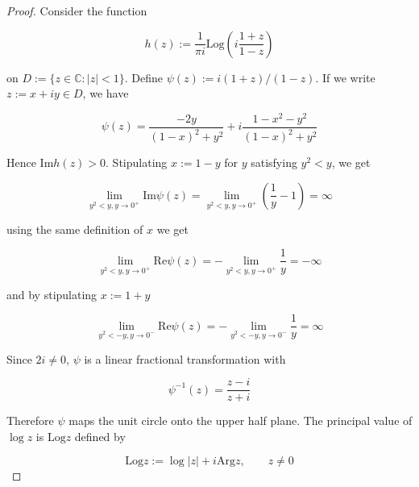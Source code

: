 \begin{proof}
	Consider the function 

	\begin{equation}
		h(z) := \frac{1}{\pi i}\mathrm{Log}\left( i\frac{1 + z}{1 - z} \right)
	\end{equation}

	on $D := \{z \in \mathbb{C} : \vert z \vert < 1\}$. Define $\psi(z) := i(1 + z)/(1 - z)$. If we write $z := x + iy \in D$, we have 

	\begin{equation}
		\psi(z) = \frac{-2y}{(1 - x)^2 + y^2} + i \frac{1 - x^2 - y^2}{(1 - x)^2 + y^2}
	\end{equation}

	Hence $\mathrm{Im} h(z) > 0$. Stipulating $x := 1 - y$ for $y$ satisfying $y^2 < y$, we get

	\begin{equation}
		\lim\limits_{y^2 < y, y \rightarrow 0^+} \mathrm{Im} \psi(z) = \lim\limits_{y^2 < y, y \rightarrow 0^+} \left( \frac{1}{y} - 1 \right) = \infty
	\end{equation}

	using the same definition of $x$ we get

	\begin{equation}
		\lim\limits_{y^2 < y, y \rightarrow 0^+} \mathrm{Re} \psi(z) = -\lim\limits_{y^2 < y, y \rightarrow 0^+} \frac{1}{y} = -\infty
	\end{equation}

	and by stipulating $x := 1 + y$

	\begin{equation}
		\lim\limits_{y^2 < -y, y \rightarrow 0^-} \mathrm{Re} \psi(z) = -\lim\limits_{y^2 < -y, y \rightarrow 0^-} \frac{1}{y} = \infty	
	\end{equation}


	Since $2i \neq 0$, $\psi$ is a linear fractional transformation with

	\begin{equation}
		\psi^{-1}(z) = \frac{z - i}{z + i}
	\end{equation}

	Therefore $\psi$ maps the unit circle onto the upper half plane. The principal value of $\log z$ is $\mathrm{Log} z$ defined by 

	\begin{equation}
		\mathrm{Log}z := \log \vert z \vert + i \mathrm{Arg}z, \qquad z \neq 0
	\end{equation}


\end{proof}
